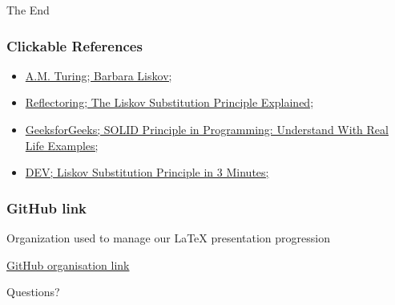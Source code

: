 \documentclass{beamer}
\begin{document}

\begin{frame}
\Huge{\centerline{The End}}
\end{frame}


\begin{frame}
\frametitle{Clickable References}
\begin{itemize}
\item \href{https://amturing.acm.org/award_winners/liskov_1108679.cfm}{ A.M. Turing; Barbara Liskov;} 

\item \href{https://reflectoring.io/lsp-explained/}{ Reflectoring; The Liskov Substitution Principle Explained;}

\item \href{https://www.geeksforgeeks.org/solid-principle-in-programming-understand-with-real-life-e}{GeeksforGeeks; SOLID Principle in Programming: Understand With Real Life Examples;}


\item \href{https://dev.to/erikwhiting88/liskov-substitution-principle-in-3-minutes-2}{DEV; Liskov Substitution Principle in 3 Minutes;}

\end{itemize}
\end{frame}


\begin{frame}
\frametitle{GitHub link}

Organization used to manage our LaTeX presentation progression

\vspace{5mm}


\href{https://github.com/Research-Methods-Presentation}{GitHub organisation link} 

\end{frame}


\begin{frame}
\Huge{\centerline{Questions?}}
\end{frame}

\end{document}

